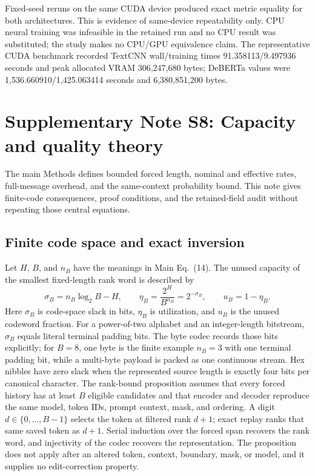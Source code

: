 \documentclass[fleqn,10pt]{wlscirep}
\begin{document}
Fixed-seed reruns on the same CUDA device produced exact metric equality for both architectures. This is evidence of same-device repeatability only. CPU neural training was infeasible in the retained run and no CPU result was substituted; the study makes no CPU/GPU equivalence claim. The representative CUDA benchmark recorded TextCNN wall/training times 91.358113/9.497936 seconds and peak allocated VRAM 306,247,680 bytes; DeBERTa values were 1,536.660910/1,425.063414 seconds and 6,380,851,200 bytes.

\section*{Supplementary Note S8: Capacity and quality theory}\label{si:s8}

The main Methods defines bounded forced length, nominal and effective rates, full-message overhead, and the same-context probability bound. This note gives finite-code consequences, proof conditions, and the retained-field audit without repeating those central equations.

\subsection*{Finite code space and exact inversion}

Let \(H\), \(B\), and \(n_B\) have the meanings in Main Eq.~(14). The unused capacity of the smallest fixed-length rank word is described by
\[
\sigma_B=n_B\log_2B-H,\qquad
\eta_B=\frac{2^H}{B^{n_B}}=2^{-\sigma_B},\qquad
u_B=1-\eta_B .
\]
Here \(\sigma_B\) is code-space slack in bits, \(\eta_B\) is utilization, and \(u_B\) is the unused codeword fraction. For a power-of-two alphabet and an integer-length bitstream, \(\sigma_B\) equals literal terminal padding bits. The byte codec records those bits explicitly; for \(B=8\), one byte is the finite example \(n_B=3\) with one terminal padding bit, while a multi-byte payload is packed as one continuous stream. Hex nibbles have zero slack when the represented source length is exactly four bits per canonical character.
The rank-bound proposition assumes that every forced history has at least \(B\) eligible candidates and that encoder and decoder reproduce the same model, token IDs, prompt context, mask, and ordering. A digit \(d\in\{0,\ldots,B-1\}\) selects the token at filtered rank \(d+1\); exact replay ranks that same saved token as \(d+1\). Serial induction over the forced span recovers the rank word, and injectivity of the codec recovers the representation. The proposition does not apply after an altered token, context, boundary, mask, or model, and it supplies no edit-correction property.
\end{document}
